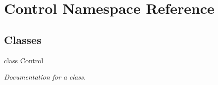 \hypertarget{namespace_control}{}\section{Control Namespace Reference}
\label{namespace_control}
\subsection*{Classes}
\begin{DoxyCompactItemize}
\item 
class \mbox{\hyperlink{class_control_1_1_control}{Control}}
\begin{DoxyCompactList}\small\item\em Documentation for a class. \end{DoxyCompactList}\end{DoxyCompactItemize}
